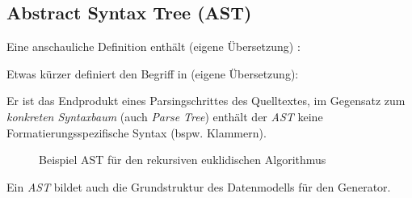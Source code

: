 \subsection{Abstract Syntax Tree (AST)}
\label{sec:ast}

Eine anschauliche Definition enthält \cite[][S. 69]{ahoCompiler} (eigene Übersetzung) :

Etwas kürzer definiert \citeauthor{gruneCompiler} den Begriff in \cite[][S. 9 ff.]{gruneCompiler} (eigene Übersetzung):

Er ist das Endprodukt eines Parsingschrittes des Quelltextes, im Gegensatz zum \emph{konkreten Syntaxbaum} (auch \emph{Parse Tree}) enthält der \emph{AST} keine Formatierungsspezifische Syntax (bspw. Klammern). 

\begin{figure}[htb]
    \centering
        \centering
    \caption{Beispiel AST für den rekursiven euklidischen Algorithmus}
    \label{fig:ast}   
\end{figure}

Ein \emph{AST} bildet auch die Grundstruktur des Datenmodells für den Generator. 
